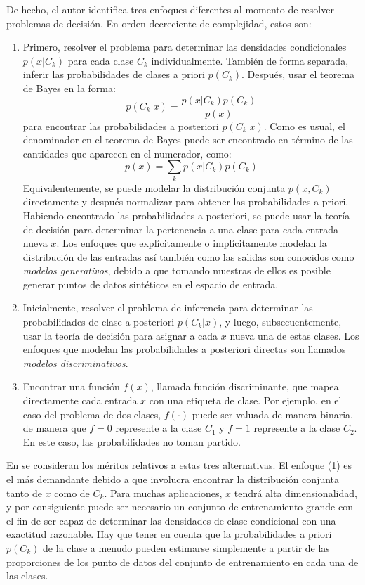 	De hecho, el autor identifica tres enfoques diferentes al momento de resolver problemas de decisión. En orden decreciente de complejidad, estos son:
		\begin{enumerate}
			\item Primero, resolver el problema para determinar las densidades condicionales $p(x \vert C_k)$ para cada clase $C_k$ individualmente. También de forma separada, inferir las probabilidades de clases a priori $p(C_k)$. Después, usar el teorema de Bayes en la forma:
			$$p(C_k \vert x) = \frac{p(x \vert C_k)p(C_k)}{p(x)} $$
			para encontrar las probabilidades a posteriori $p(C_k \vert x)$. Como es usual, el denominador en el teorema de Bayes puede ser encontrado en término de las cantidades que aparecen en el numerador, como:
			 $$p(x) = \sum_k p(x \vert C_k)p(C_k) $$
			Equivalentemente, se puede modelar la distribución conjunta $p(x,C_k)$ directamente y después normalizar para obtener las probabilidades a priori. Habiendo encontrado las probabilidades a posteriori, se puede usar la teoría de decisión para determinar la pertenencia a una clase para cada entrada nueva $x$. Los enfoques que explícitamente o implícitamente modelan la distribución de las entradas así también como las salidas son conocidos como \textit{modelos generativos}, debido a que tomando muestras de ellos es posible generar puntos de datos sintéticos en el espacio de entrada.
			\item Inicialmente, resolver el problema de inferencia para determinar las  probabilidades de clase a posteriori $p(C_k \vert x)$, y luego, subsecuentemente, usar la teoría de decisión para asignar a cada $x$ nueva una de estas clases. Los enfoques que modelan las probabilidades a posteriori directas son llamados \textit{modelos discriminativos}.
			\item Encontrar una función $f(x)$, llamada función discriminante, que mapea directamente cada entrada $x$ con una etiqueta de clase. Por ejemplo, en el caso del problema de dos clases, $f(\cdot)$ puede ser valuada de manera binaria, de manera que $f = 0$ represente a la clase $C_1$ y $f = 1$ represente a la clase $C_2$. En este caso, las probabilidades no toman partido. 
		\end{enumerate}
		
	En \cite{Bis07} se consideran los méritos relativos a estas tres alternativas. El enfoque (1) es el más demandante debido a que involucra encontrar la distribución conjunta tanto de $x$ como de $C_k$. Para muchas aplicaciones, $x$ tendrá alta dimensionalidad, y por consiguiente puede ser necesario un conjunto de entrenamiento grande con el fin de ser capaz de determinar las densidades de clase condicional con una exactitud razonable. Hay que tener en cuenta que la probabilidades a priori $p(C_k)$ de la clase a menudo pueden estimarse simplemente a partir de las proporciones de los punto de datos del conjunto de entrenamiento en cada una de las clases.
		
